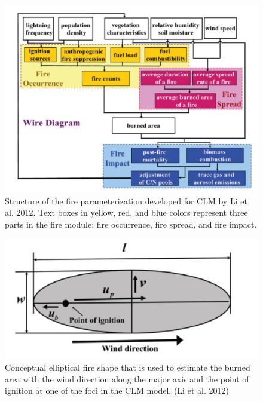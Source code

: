 \documentclass[12pt,oneside]{book}
\begin{document}
\begin{figure}

{\centering \includegraphics[width=0.8\linewidth]{figures/chap8/f87_CLM_fire} 

}

\caption{Structure of the fire parameterization developed for CLM by Li et al. 2012. Text boxes in yellow, red, and blue colors represent three parts in the fire module: fire occurrence, fire spread, and fire impact.}\label{fig:f87}
\end{figure}

\begin{figure}

{\centering \includegraphics[width=0.8\linewidth]{figures/chap8/f88_fire_ellips} 

}

\caption{Conceptual elliptical fire shape that is used to estimate the burned area with the wind direction along the major axis and the point of ignition at one of the foci in the CLM model. (Li et al. 2012)}\label{fig:f88}
\end{figure}
\end{document}
